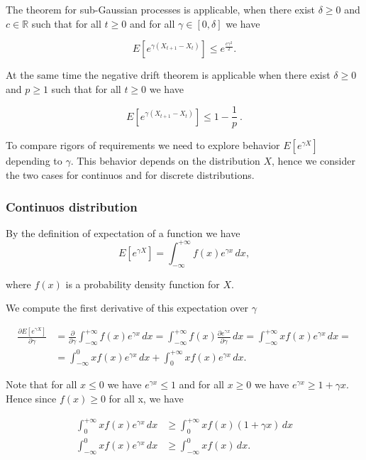 \documentclass[12pt, a4paper]{article}
\theoremstyle{remark}
\begin{document}


The theorem for sub-Gaussian processes is applicable, when there exist $\delta \geq 0$ and $c \in \mathbb{R}$ such that for all $t \geq 0$ and for all $\gamma \in [0, \delta]$ we have

$$  E\left[e^{\gamma (X_{t + 1} - X_{t})}\right] \leq e^{\frac{c \gamma^2}{2}}.$$

At the same time the negative drift theorem is applicable when there exist $\delta \geq 0$ and $p \geq 1$ such that for all $t \geq 0$ we have

$$
    E\left[e^{\gamma (X_{t + 1} - X_{t})}\right] \leq 1 - \frac{1}{p}\ .$$

To compare rigors of requirements we need to explore behavior $E[e^{\gamma X}]$ depending to $\gamma$. This behavior depends on the distribution $X$, hence we consider the two cases for continuos and for discrete distributions.

\subsubsection*{Continuos distribution}

By the definition of expectation of a function we have
\[
    E[e^{\gamma X}] = \int_{-\infty}^{+\infty} f(x) e^{\gamma x} \,dx,
\]

where $f(x)$ is a probability density function for $X$.

\hfill

We compute the first derivative of this expectation over $\gamma$

\begin{align*}
    \frac{\partial E[e^{\gamma X}]}{\partial \gamma} & = \frac{\partial}{\partial \gamma} \int_{-\infty}^{+\infty} f(x) e^{\gamma x} \, dx = \int_{-\infty}^{+\infty} f(x) \frac{\partial e^{\gamma x}}{\partial \gamma} \, dx = \int_{-\infty}^{+\infty} x f(x) e^{\gamma x} \, dx = \\
    & = \int_{-\infty}^{0} x f(x) e^{\gamma x} \, dx + \int_{0}^{+\infty} x f(x) e^{\gamma x} \, dx.
\end{align*}

Note that for all $x \leq 0$ we have $e^{\gamma x} \leq 1$ and for all $x \geq 0$ we have $e^{\gamma x} \geq 1 + \gamma x$. Hence since $f(x) \geq 0$ for all x, we have

\begin{align*}
    \int_{0}^{+\infty} x f(x) e^{\gamma x} \, dx & \geq \int_{0}^{+\infty} x f(x) (1 + \gamma x)\, dx \\
    \int_{-\infty}^{0} x f(x) e^{\gamma x} \, dx & \geq \int_{-\infty}^{0} x f(x)\, dx.
\end{align*}
\end{document}
